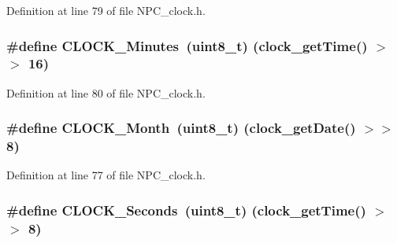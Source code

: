 Definition at line 79 of file N\+P\+C\+\_\+clock.\+h.

\subsubsection[{\texorpdfstring{C\+L\+O\+C\+K\+\_\+\+Minutes}{CLOCK_Minutes}}]{\setlength{\rightskip}{0pt plus 5cm}\#define C\+L\+O\+C\+K\+\_\+\+Minutes~(uint8\+\_\+t) ({\bf clock\+\_\+get\+Time}() $>$$>$ 16)}\hypertarget{group___c_l_o_c_k___value_ga302d9ee9e79c96969e558b9ffdba3212}{}\label{group___c_l_o_c_k___value_ga302d9ee9e79c96969e558b9ffdba3212}


Definition at line 80 of file N\+P\+C\+\_\+clock.\+h.

\subsubsection[{\texorpdfstring{C\+L\+O\+C\+K\+\_\+\+Month}{CLOCK_Month}}]{\setlength{\rightskip}{0pt plus 5cm}\#define C\+L\+O\+C\+K\+\_\+\+Month~(uint8\+\_\+t) ({\bf clock\+\_\+get\+Date}() $>$$>$ 8)}\hypertarget{group___c_l_o_c_k___value_gabd717170aa836b16355413e2c5ca0ad8}{}\label{group___c_l_o_c_k___value_gabd717170aa836b16355413e2c5ca0ad8}


Definition at line 77 of file N\+P\+C\+\_\+clock.\+h.

\subsubsection[{\texorpdfstring{C\+L\+O\+C\+K\+\_\+\+Seconds}{CLOCK_Seconds}}]{\setlength{\rightskip}{0pt plus 5cm}\#define C\+L\+O\+C\+K\+\_\+\+Seconds~(uint8\+\_\+t) ({\bf clock\+\_\+get\+Time}() $>$$>$ 8)}\hypertarget{group___c_l_o_c_k___value_ga4c539bc50b05addb6629dfea687d65b7}{}\label{group___c_l_o_c_k___value_ga4c539bc50b05addb6629dfea687d65b7}


